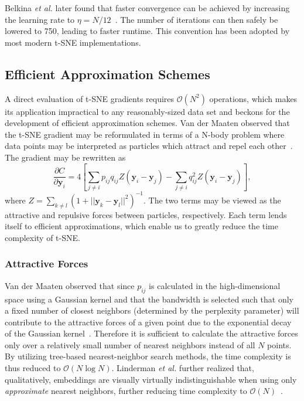 \documentclass[twocolumn]{bmcart}
\begin{document}
Belkina \textit{et al.} later found that faster convergence can be achieved by increasing the learning rate to $\eta=N/12$~\cite{belkina2019automated}. The number of iterations can then safely be lowered to 750, leading to faster runtime. This convention has been adopted by most modern t-SNE implementations.

\subsection*{Efficient Approximation Schemes}
A direct evaluation of t-SNE gradients requires $\mathcal{O}(N^2)$ operations, which makes its application impractical to any reasonably-sized data set and beckons for the development of efficient approximation schemes. Van der Maaten observed that the t-SNE gradient may be reformulated in terms of a N-body problem where data points may be interpreted as particles which attract and repel each other~\cite{van2014accelerating}. The gradient may be rewritten as
\begin{equation}
\frac{\partial C}{\partial \mathbf{y}_i} = 4 \left [ \sum_{j \neq i} p_{ij} q_{ij} Z \left ( \mathbf{y}_i - \mathbf{y}_j \right ) -\sum_{j \neq i} q_{ij}^2 Z \left ( \mathbf{y}_i - \mathbf{y}_j \right ) \right ], \label{eq:grad_attr_rep}
\end{equation}
where $Z = \sum_{k \neq l}\left ( 1 + || \mathbf{y}_k - \mathbf{y}_l ||^2 \right )^{-1}$. The two terms may be viewed as the attractive and repulsive forces between particles, respectively. Each term lends itself to efficient approximations, which enable us to greatly reduce the time complexity of t-SNE.

\subsubsection*{Attractive Forces}

Van der Maaten observed that since $p_{ij}$ is calculated in the high-dimensional space using a Gaussian kernel and that the bandwidth is selected such that only a fixed number of closest neighbors (determined by the perplexity parameter) will contribute to the attractive forces of a given point due to the exponential decay of the Gaussian kernel~\cite{van2014accelerating}. Therefore it is sufficient to calculate the attractive forces only over a relatively small number of nearest neighbors instead of all $N$ points. By utilizing tree-based nearest-neighbor search methods, the time complexity is thus reduced to $\mathcal{O}(N \log N)$. Linderman \textit{et al.} further realized that, qualitatively, embeddings are visually virtually indistinguishable when using only \textit{approximate} nearest neighbors, further reducing time complexity to $\mathcal{O}(N)$~\cite{linderman2019fast}.
\end{document}
